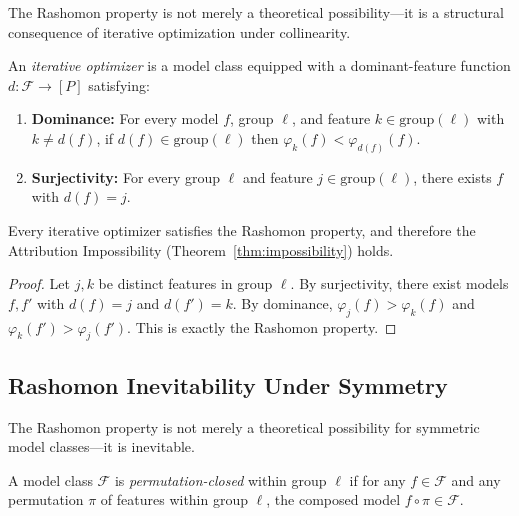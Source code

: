 \documentclass{jmlr}
\begin{document}
The Rashomon property is not merely a theoretical possibility---it is a structural consequence of iterative optimization under collinearity.

\begin{definition}
\label{def:iterative}
An \emph{iterative optimizer} is a model class equipped with a dominant-feature function $d\colon \mathcal{F} \to [P]$ satisfying:
\begin{enumerate}
    \item \textbf{Dominance:} For every model $f$, group $\ell$, and feature $k \in \text{group}(\ell)$ with $k \neq d(f)$, if $d(f) \in \text{group}(\ell)$ then $\varphi_k(f) < \varphi_{d(f)}(f)$.
    \item \textbf{Surjectivity:} For every group $\ell$ and feature $j \in \text{group}(\ell)$, there exists $f$ with $d(f) = j$.
\end{enumerate}
\end{definition}

\begin{proposition}
\label{prop:iterative-rashomon}
Every iterative optimizer satisfies the Rashomon property, and therefore the Attribution Impossibility (Theorem~\ref{thm:impossibility}) holds.
\end{proposition}

\begin{proof}
Let $j, k$ be distinct features in group $\ell$.
By surjectivity, there exist models $f, f'$ with $d(f) = j$ and $d(f') = k$.
By dominance, $\varphi_j(f) > \varphi_k(f)$ and $\varphi_k(f') > \varphi_j(f')$.
This is exactly the Rashomon property.
\end{proof}

\subsection{Rashomon Inevitability Under Symmetry}
\label{sec:rashomon-inevitability}

The Rashomon property is not merely a theoretical possibility for symmetric model classes---it is inevitable.

\begin{definition}
\label{def:perm-closure}
A model class $\mathcal{F}$ is \emph{permutation-closed} within group $\ell$ if for any $f \in \mathcal{F}$ and any permutation $\pi$ of features within group $\ell$, the composed model $f \circ \pi \in \mathcal{F}$.
\end{definition}
\end{document}
